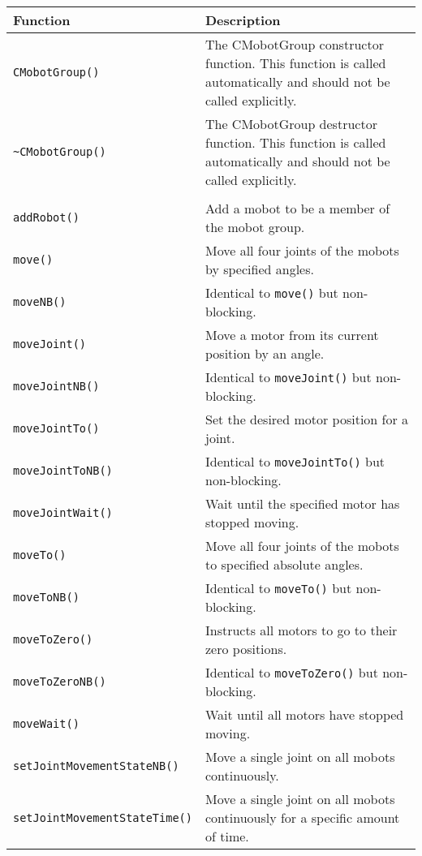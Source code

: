 \begin{tabular}{p{1.75in}p{4.5in}}
\hline
Function & Description \\
\hline
\texttt{CMobotGroup()} & The CMobotGroup constructor function. This function
is called automatically and should not be called explicitly. \\
\texttt{\textasciitilde CMobotGroup()} & The CMobotGroup destructor function. This function
is called automatically and should not be called explicitly. \\
& \\
\texttt{addRobot()} & Add a mobot to be a member of the mobot group. \\
\texttt{move()} & Move all four joints of the mobots by specified angles. \\
\texttt{moveNB()} & Identical to \texttt{move()} but non-blocking. \\
\texttt{moveJoint()} & Move a motor from its current position by an angle. \\
\texttt{moveJointNB()} & Identical to \texttt{moveJoint()} but non-blocking. \\
\texttt{moveJointTo()} & Set the desired motor position for a joint. \\
\texttt{moveJointToNB()} & Identical to \texttt{moveJointTo()} but non-blocking. \\
\texttt{moveJointWait()} & Wait until the specified motor has stopped moving. \\
\texttt{moveTo()} & Move all four joints of the mobots to specified absolute angles. \\
\texttt{moveToNB()} & Identical to \texttt{moveTo()} but non-blocking. \\
\texttt{moveToZero()} & Instructs all motors to go to their zero positions. \\
\texttt{moveToZeroNB()} & Identical to \texttt{moveToZero()} but non-blocking. \\
\texttt{moveWait()} & Wait until all motors have stopped moving. \\
\texttt{setJointMovementStateNB()} & Move a single joint on all mobots continuously. \\
\texttt{setJointMovementStateTime()} & Move a single joint on all mobots continuously for a specific amount of time. \\

\end{tabular}
